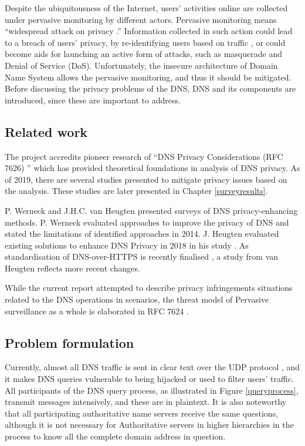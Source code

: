 \documentclass[a4paper,12pt]{article}
\begin{document}
Despite the ubiquitousness of the Internet, users' activities online are collected under pervasive monitoring by different actors.
Pervasive monitoring means ``widespread attack on privacy \cite{rfc7258}.'' Information collected in such action could lead to a breach of users’ privacy, by re-identifying users based on traffic \cite{herrmann2010analyzing}, or could become aids for launching an active form of attacks, such as masquerade and Denial of Service (DoS).
Unfortunately, the insecure architecture of Domain Name System allows the pervasive monitoring, and thus it should be mitigated.
Before discussing the privacy problems of the DNS, DNS and its components are introduced, since these are important to address.



\subsection{Related work}
The project accredits pioneer research of ``DNS Privacy Considerations (RFC 7626) \cite{rfc7626}'' which has provided theoretical foundations in analysis of DNS privacy. 
As of 2019, there are several studies presented to mitigate privacy issues based on the analysis. These studies are later presented in Chapter \ref{surveyresults}.

P. Werneck and J.H.C. van Heugten presented surveys of DNS privacy-enhancing methods. P. Werneck evaluated approaches to improve the privacy of DNS and stated the limitations of identified approaches \cite{werneck2014dns} in 2014. J. Heugten evaluated existing solutions to enhance DNS Privacy in 2018 in his study \cite{van2018privacy}. As standardisation of DNS-over-HTTPS is recently finalised \cite{rfc8484}, a study from van Heugten reflects more recent changes.

While the current report attempted to describe privacy infringements situations related to the DNS operations in scenarios, the threat model of Pervasive surveillance as a whole is elaborated in RFC 7624 \cite{rfc7624}.

\subsection{Problem formulation}\label{problemformulation}
Currently, almost all DNS traffic is sent in clear text \cite{rfc7626} over the UDP protocol \cite{tcp2014analysis}, and it makes DNS queries vulnerable to being hijacked or used to filter users' traffic.
All participants of the DNS query process, as illustrated in Figure \ref{queryprocess}, transmit messages intensively, and these are in plaintext.
It is also noteworthy that all participating authoritative name servers receive the same questions, although it is not necessary for Authoritative servers in higher hierarchies in the process to know all the complete domain address in question.
\end{document}
